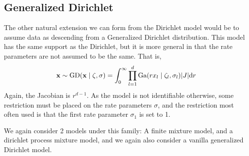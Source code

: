 \subsection{Generalized Dirichlet}
The other natural extension we can form from the Dirichlet model would be to assume data as
  descending from a Generalized Dirichlet distribution.  This model has the same support as the
  Dirichlet, but it is more general in that the rate parameters are not assumed to be the same.
  That is,
  \begin{equation}
    \label{eq:gendirichletrv}
    {\bf x} \sim \text{GD}({\bf x}\mid \zeta, \sigma) =
        \int_0^{\infty}\prod_{l = 1}^d\text{Ga}(rx_l\mid \zeta_l, \sigma_l)\lvert J\rvert\text{d}r
  \end{equation}
Again, the Jacobian is $r^{d-1}$.  As the model is not identifiable otherwise, some restriction
  must be placed on the rate parameters $\sigma$, and the restriction most often used is that the
  first rate parameter $\sigma_1$ is set to 1.

We again consider 2 models under this family: A finite mixture model, and a dirichlet process
  mixture model, and we again also consider a vanilla generalized Dirichlet model.

